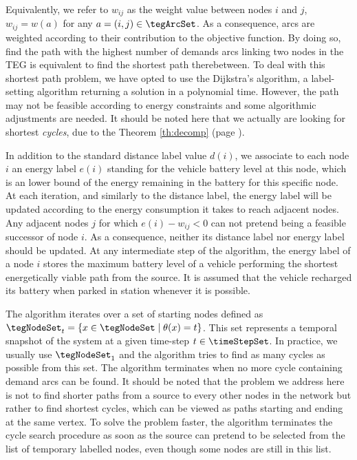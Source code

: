 \begin{bibunit}[ieeetr]
Equivalently, we refer to $w_{ij}$ as the weight value between nodes $i$ and $j$, \ie $w_{ij} = w(a)$ for any $a = (i, j) \in \tegArcSet$.
As a consequence, arcs are weighted according to their contribution to the objective function.
By doing so, find the path with the highest number of demands arcs linking two nodes in the TEG is equivalent to find the shortest path therebetween.
To deal with this shortest path problem, we have opted to use the Dijkstra's algorithm, a label-setting algorithm returning a solution in a polynomial time.
However, the path may not be feasible according to energy constraints and some algorithmic adjustments are needed.
It should be noted here that we actually are looking for shortest \emph{cycles}, due to the Theorem \ref{th:decomp} (page \pageref{th:decomp}).


\medskip
In addition to the standard distance label value $d(i)$, we associate to each node $i$ an energy label $e(i)$ standing for the vehicle battery level at this node, which is an lower bound of the energy remaining in the battery for this specific node.
At each iteration, and similarly to the distance label, the energy label will be updated according to the energy consumption it takes to reach adjacent nodes.
Any adjacent nodes $j$ for which $e(i)- w_{ij} < 0$ can not pretend being a feasible successor of node $i$.
As a consequence, neither its distance label nor energy label should be updated.
At any intermediate step of the algorithm, the energy label of a node $i$ stores the maximum battery level of a vehicle performing the shortest energetically viable path from the source.
It is assumed that the vehicle recharged its battery when parked in station whenever it is possible.

\medskip
The algorithm iterates over a set of starting nodes defined as $\tegNodeSet_t = \{x \in \tegNodeSet \mid \theta (x) = t\}$.
This set represents a temporal snapshot of the system at a given time-step $t \in \timeStepSet$.
In practice, we usually use $\tegNodeSet_1$ and the algorithm tries to find as many cycles as possible from this set.
The algorithm terminates when no more cycle containing demand arcs can be found.
It should be noted that the problem we address here is not to find shorter paths from a source to every other nodes in the network but rather to find shortest cycles, which can be viewed as paths starting and ending at the same vertex.
To solve the problem faster, the algorithm terminates the cycle search procedure as soon as the source can pretend to be selected from the list of temporary labelled nodes, even though some nodes are still in this list.


\end{bibunit}
